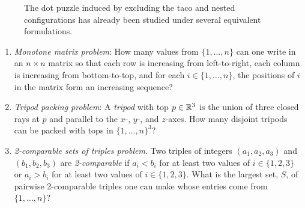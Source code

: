 \documentclass{patmorin}
\begin{document}
\begin{figure}
  \caption{The dot puzzle induced by excluding the taco and nested configurations
    has already been studied under several equivalent formulations.}
\end{figure}

\begin{enumerate}
  \item \emph{Monotone matrix problem}: How many values from
  $\{1,\ldots,n\}$ can one write in an $n\times n$ matrix so that each
  row is increasing from left-to-right, each column is increasing from
  bottom-to-top, and for each $i\in\{1,\ldots,n\}$, the positions of $i$
  in the matrix form an increasing sequence?

  \item \emph{Tripod packing problem}: A \emph{tripod} with top $p\in\mathbb{R}^3$
  is the union of three closed rays at $p$ and parallel to the $x$-,
  $y$-, and $z$-axes.  How many disjoint tripods can be packed with tops
  in $\{1,\ldots,n\}^3$?

  \item \emph{2-comparable sets of triples problem}.  Two triples of
  integers $(a_1,a_2,a_3)$ and $(b_1,b_2,b_3)$ are \emph{2-comparable}
  if $a_i< b_i$ for at least two values of $i\in\{1,2,3\}$ or $a_i > b_i$
  for at least two values of $i\in\{1,2,3\}$.  What is the largest set,
  $S$, of pairwise 2-comparable triples one can make whose entries come
  from $\{1,\ldots,n\}$?
\end{enumerate}
\end{document}

